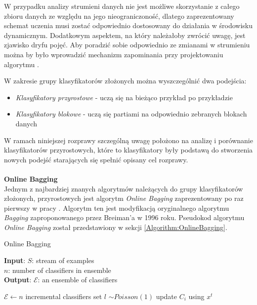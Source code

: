 \noindent W przypadku analizy strumieni danych nie jest możliwe skorzystanie z całego zbioru danych ze względu na jego nieograniczoność, dlatego zaprezentowany schemat uczenia musi zostać odpowiednio dostosowany do działania w środowisku dynamicznym. Dodatkowym aspektem, na który należałoby zwrócić uwagę, jest zjawisko dryfu pojęć. Aby poradzić sobie odpowiednio ze zmianami w strumieniu można by było wprowadzić mechanizm zapominania przy projektowaniu algorytmu \cite{BrzezPhd2015}.

W zakresie grupy klasyfikatorów złożonych można wyszczególnić dwa podejścia:

\begin{itemize}
    \item \textit{Klasyfikatory przyrostowe} - uczą się na bieżąco przykład po przykładzie
    \item \textit{Klasyfikatory blokowe} - uczą się partiami na odpowiednio zebranych blokach danych
\end{itemize}

\noindent W ramach niniejszej rozprawy szczególną uwagę położono na  analizę i porównanie klasyfikatorów przyrostowych, które to klasyfikatory były podstawą do stworzenia nowych podejść starających się spełnić opisany cel rozprawy.\\\\
\textbf{Online Bagging}\\

\noindent Jednym z najbardziej znanych algorytmów należących do grupy klasyfikatorów złożonych, przyrostowych jest algorytm \textit{Online Bagging} zaprezentowany po raz pierwszy w pracy \cite{Article:OnlineBagging}. Algorytm ten jest modyfikacją oryginalnego algorytmu \textit{Bagging} zaproponowanego przez Breiman'a w 1996 roku. Pseudokod algorytmu \textit{Online Bagging} został przedstawiony w sekcji \ref{Algorithm:OnlineBagging}.

\begin{algorithm}
    \caption{Online Bagging \cite{Article:OnlineBagging}}\label{Algorithm:OnlineBagging}
    \textbf{Input}: $S$: stream of examples \\
    \hspace*{12mm} $n$: number of classifiers in ensemble \\
    \textbf{Output}: $\mathcal{E}$: an ensemble of classifiers \\
    \begin{algorithmic}[1]
    \State $\mathcal{E} \gets n$ incremental classifiers
    \State set $l$ $\sim Poisson(1)$
    \State update $C_i$ using $x^t$
    \EndFor
    \EndFor
    \EndFor
    \end{algorithmic}
\end{algorithm}

